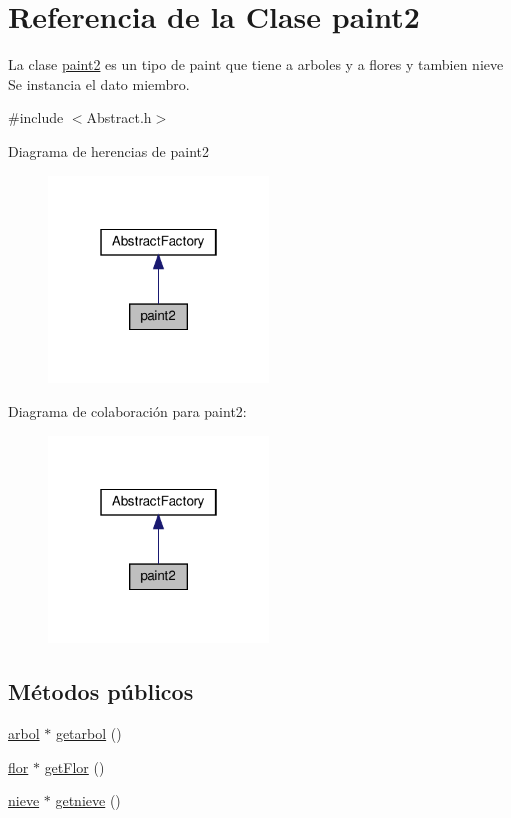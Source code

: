 \hypertarget{classpaint2}{}\section{Referencia de la Clase paint2}
\label{classpaint2}


La clase \hyperlink{classpaint2}{paint2} es un tipo de paint que tiene a arboles y a flores y tambien nieve  Se instancia el dato miembro.  




{\ttfamily \#include $<$Abstract.\+h$>$}



Diagrama de herencias de paint2
\nopagebreak
\begin{figure}[H]
\begin{center}
\leavevmode
\includegraphics[width=166pt]{classpaint2__inherit__graph}
\end{center}
\end{figure}


Diagrama de colaboración para paint2\+:
\nopagebreak
\begin{figure}[H]
\begin{center}
\leavevmode
\includegraphics[width=166pt]{classpaint2__coll__graph}
\end{center}
\end{figure}
\subsection*{Métodos públicos}
\begin{DoxyCompactItemize}
\item 
\hyperlink{classarbol}{arbol} $\ast$ \hyperlink{classpaint2_a07e7d130f298e613dcdecf073acc8734}{getarbol} ()
\item 
\hyperlink{classflor}{flor} $\ast$ \hyperlink{classpaint2_af06042693fb9817ae4fa381a1d5699c9}{get\+Flor} ()
\item 
\hyperlink{classnieve}{nieve} $\ast$ \hyperlink{classpaint2_a0aeaabfae73dd3ddde19a6636c72732a}{getnieve} ()
\end{DoxyCompactItemize}


